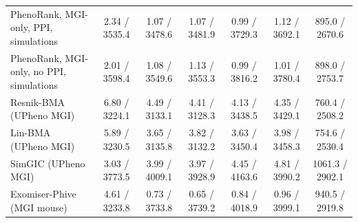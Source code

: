 \begin{landscape}
\begin{table}[p]
\begin{tabular}{lcccccc}
PhenoRank, MGI-only, PPI, simulations & 2.34 / 3535.4 & 1.07 / 3478.6 & 1.07 / 3481.9 & 0.99 / 3729.3 & 1.12 / 3692.1 & 895.0 / 2670.6 \\
PhenoRank, MGI-only, no PPI, simulations & 2.01 / 3598.4 & 1.08 / 3549.6 & 1.13 / 3553.3 & 0.99 / 3816.2 & 1.01 / 3780.4 & 898.0 / 2753.7 \\
Resnik-BMA (UPheno MGI) & 6.80 / 3224.1 & 4.49 / 3133.1 & 4.41 / 3128.3 & 4.13 / 3438.5 & 4.35 / 3429.1 & 760.4 / 2508.2 \\
Lin-BMA (UPheno MGI) & 5.89 / 3230.5 & 3.65 / 3135.8 & 3.82 / 3132.2 & 3.63 / 3450.4 & 3.98 / 3458.3 & 754.6 / 2530.4 \\
SimGIC (UPheno MGI) & 3.03 / 3773.5 & 3.99 / 4009.1 & 3.97 / 3928.9 & 4.45 / 4163.6 & 4.81 / 3990.2 & 1061.3 / 2902.1 \\
Exomiser-Phive (MGI mouse) & 4.61 / 3233.8 & 0.73 / 3733.8 & 0.65 / 3739.2 & 0.84 / 4018.9 & 0.96 / 3999.1 & 940.5 / 2919.8 \\
\bottomrule
\end{tabular}
\end{table}
\clearpage
\end{landscape}
